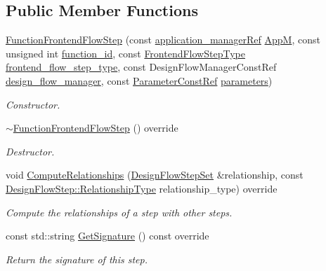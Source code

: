\subsection*{Public Member Functions}
\begin{DoxyCompactItemize}
\item 
\hyperlink{classFunctionFrontendFlowStep_a468b4735cbda0052511a1f9a1d02f32b}{Function\+Frontend\+Flow\+Step} (const \hyperlink{application__manager_8hpp_a04ccad4e5ee401e8934306672082c180}{application\+\_\+manager\+Ref} \hyperlink{classFrontendFlowStep_a0ac0d8db2a378416583f51c4faa59d15}{AppM}, const unsigned int \hyperlink{classFunctionFrontendFlowStep_a58ef2383ad1a212a8d3f396625a4b616}{function\+\_\+id}, const \hyperlink{frontend__flow__step_8hpp_afeb3716c693d2b2e4ed3e6d04c3b63bb}{Frontend\+Flow\+Step\+Type} \hyperlink{classFrontendFlowStep_ad49067d6a17119d47316149ab757b60d}{frontend\+\_\+flow\+\_\+step\+\_\+type}, const Design\+Flow\+Manager\+Const\+Ref \hyperlink{classDesignFlowStep_ab770677ddf087613add30024e16a5554}{design\+\_\+flow\+\_\+manager}, const \hyperlink{Parameter_8hpp_a37841774a6fcb479b597fdf8955eb4ea}{Parameter\+Const\+Ref} \hyperlink{classDesignFlowStep_a802eaafe8013df706370679d1a436949}{parameters})
\begin{DoxyCompactList}\small\item\em Constructor. \end{DoxyCompactList}\item 
\hyperlink{classFunctionFrontendFlowStep_a98d5dace07585982ed44b425805051b3}{$\sim$\+Function\+Frontend\+Flow\+Step} () override
\begin{DoxyCompactList}\small\item\em Destructor. \end{DoxyCompactList}\item 
void \hyperlink{classFunctionFrontendFlowStep_a1a815ea7885f3e92e414dadd40c43cba}{Compute\+Relationships} (\hyperlink{classDesignFlowStepSet}{Design\+Flow\+Step\+Set} \&relationship, const \hyperlink{classDesignFlowStep_a723a3baf19ff2ceb77bc13e099d0b1b7}{Design\+Flow\+Step\+::\+Relationship\+Type} relationship\+\_\+type) override
\begin{DoxyCompactList}\small\item\em Compute the relationships of a step with other steps. \end{DoxyCompactList}\item 
const std\+::string \hyperlink{classFunctionFrontendFlowStep_a89e3f6d142de8aacb36eeb7b3f3d5ad8}{Get\+Signature} () const override
\begin{DoxyCompactList}\small\item\em Return the signature of this step. \end{DoxyCompactList}\item 

\end{DoxyCompactItemize}
